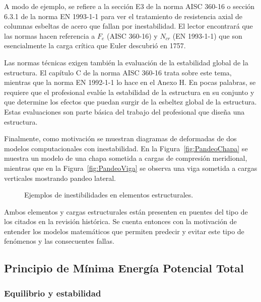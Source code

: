 A modo de ejemplo, se refiere a la sección E3 de la norma AISC 360-16 o sección 6.3.1 de la norma EN 1993-1-1 para ver el tratamiento de resistencia axial de columnas esbeltas de acero que fallan por inestabilidad. %
%
El lector encontrará que las normas hacen referencia a $F_e$ (AISC 360-16) y $N_{cr}$ (EN 1993-1-1) que son esencialmente la carga crítica que Euler descubrió en 1757.

Las normas técnicas exigen también la evaluación de la estabilidad global de la estructura. El capítulo C de la norma AISC 360-16 trata sobre este tema, mientras que la norma EN 1992-1-1 lo hace en el Anexo H. %
%
En pocas palabras, se requiere que el profesional evalúe la estabilidad de la estructura en su conjunto y que determine los efectos que puedan surgir de la esbeltez global de la estructura. Estas evaluaciones son parte básica del trabajo del profesional que diseña una estructura.

Finalmente, como motivación se muestran diagramas de deformadas de dos modelos computacionales con inestabilidad. En la Figura~\ref{fig:PandeoChapa} se muestra un modelo de una chapa sometida a cargas de compresión meridional, mientras que en la Figura~\ref{fig:PandeoViga} se observa una viga sometida a cargas verticales mostrando pandeo lateral. 
%
\begin{figure}[htb]
	\centering
	\hfill
	\caption{Ejemplos de inestibilidades en elementos estructurales.}
	\label{fig:PandeoContinuo}
\end{figure}

Ambos elementos y cargas estructurales están presenten en puentes del tipo de los citados en la revisión histórica. Se cuenta entonces con la motivación de entender los modelos matemáticos que permiten predecir y evitar este tipo de fenómenos y las consecuentes fallas.

\subsection{Principio de Mínima Energía Potencial Total}


\subsubsection{Equilibrio y estabilidad} 

